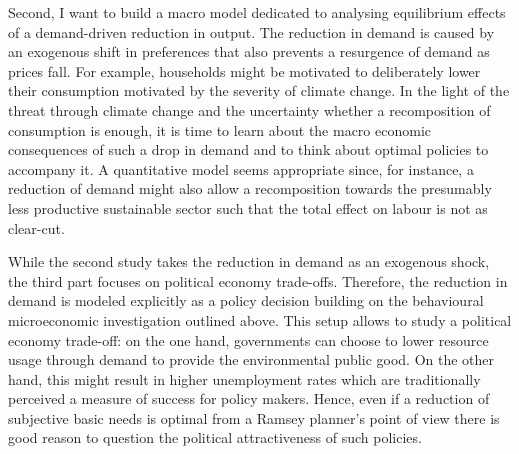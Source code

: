 \documentclass[12pt]{article}
\begin{document}
Second, I want to build a macro model dedicated to analysing equilibrium effects of a demand-driven reduction in output. 
The reduction in demand is caused by an exogenous shift in preferences that also prevents a resurgence of demand as prices fall. For example, households might be motivated to deliberately lower their consumption motivated by the severity of climate change. 
In the light of the threat through climate change and the uncertainty whether a recomposition of consumption is enough, it is time to learn about the macro economic consequences of such a drop in demand and to think about optimal policies to accompany it.
A quantitative model seems appropriate since, for instance, a reduction of demand might also allow a recomposition towards the presumably less productive sustainable sector such that the total effect on labour is not as clear-cut. 

While the second study takes the reduction in demand as an exogenous shock, the third part focuses on political economy trade-offs.
Therefore, the reduction in demand is modeled explicitly as a policy decision building on the behavioural microeconomic investigation outlined above. This setup allows to study a political economy trade-off: on the one hand, governments can choose to lower resource usage through demand to provide the environmental public good. On the other hand, this might result in higher unemployment rates which are traditionally perceived a measure of success for policy makers. Hence, even if a reduction of subjective basic needs is optimal from a Ramsey planner's point of view there is good reason to question the political attractiveness of such policies.

\clearpage

\end{document}
